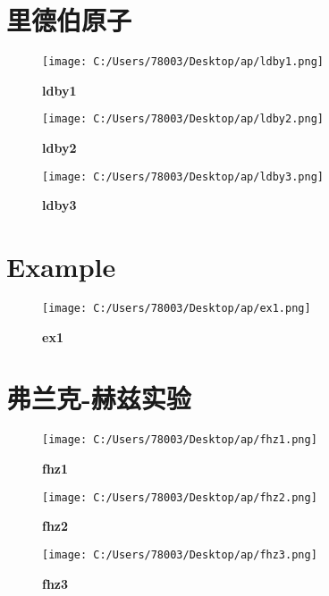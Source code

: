 \documentclass[UTF8]{report}
\theoremstyle{MyLineTheoremStyle} %
\theoremstyle{MyBlockTheoremStyle} %
\theoremstyle{MySubsubsectionStyle} %
\begin{document}
\cleardoublepage
\section{里德伯原子}

\begin{figure}[ht]
    \centering
    \texttt{[image: C:/Users/78003/Desktop/ap/ldby1.png]}
    \caption{\textbf{ldby1}}
    \label{fig:ldby1}
\end{figure}

\begin{figure}[ht]
    \centering
    \texttt{[image: C:/Users/78003/Desktop/ap/ldby2.png]}
    \caption{\textbf{ldby2}}
    \label{fig:ldby2}
\end{figure}

\begin{figure}[ht]
    \centering
    \texttt{[image: C:/Users/78003/Desktop/ap/ldby3.png]}
    \caption{\textbf{ldby3}}
    \label{fig:ldby3}
\end{figure}

\cleardoublepage
\section{Example}

\begin{figure}[ht]
    \centering
    \texttt{[image: C:/Users/78003/Desktop/ap/ex1.png]}
    \caption{\textbf{ex1}}
    \label{fig:ex1}
\end{figure}

\cleardoublepage
\section{弗兰克-赫兹实验}

\begin{figure}[ht]
    \centering
    \texttt{[image: C:/Users/78003/Desktop/ap/fhz1.png]}
    \caption{\textbf{fhz1}}
    \label{fig:fhz1}
\end{figure}

\begin{figure}[ht]
    \centering
    \texttt{[image: C:/Users/78003/Desktop/ap/fhz2.png]}
    \caption{\textbf{fhz2}}
    \label{fig:fhz2}
\end{figure}

\begin{figure}[ht]
    \centering
    \texttt{[image: C:/Users/78003/Desktop/ap/fhz3.png]}
    \caption{\textbf{fhz3}}
    \label{fig:fhz3}
\end{figure}
\end{document}

